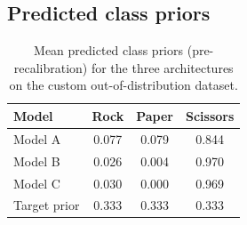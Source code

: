 \documentclass{article}
\begin{document}
\subsection{Predicted class priors}

\begin{table}[H]
\centering
\caption{Mean predicted class priors (pre-recalibration) for the three architectures on the custom out-of-distribution dataset.}
\label{tab:app_custom_pred_priors}
\begin{tabular}{lccc}
\hline
\textbf{Model} & \textbf{Rock} & \textbf{Paper} & \textbf{Scissors} \\
\hline
Model A & 0.077 & 0.079 & 0.844 \\
Model B & 0.026 & 0.004 & 0.970 \\
Model C & 0.030 & 0.000 & 0.969 \\
\hline
Target prior & 0.333 & 0.333 & 0.333 \\
\hline
\end{tabular}
\end{table}
\end{document}
